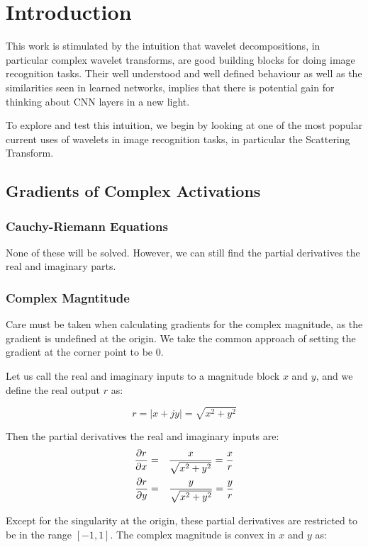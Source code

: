 \chapter{Introduction}\label{ch:intro}

This work is stimulated by the intuition that wavelet decompositions, in particular
complex wavelet transforms, are good building blocks for doing image recognition
tasks. Their well understood and well defined behaviour as well as the
similarities seen in learned networks, implies that there is potential gain for
thinking about CNN layers in a new light. 

To explore and test this intuition, we begin by looking at one of the most popular current uses of
wavelets in image recognition tasks, in particular the Scattering Transform. 

\section{Gradients of Complex Activations}
\subsection{Cauchy-Riemann Equations}
None of these will be solved. However, we can still find the partial derivatives \wrt the real and
imaginary parts.

\subsection{Complex Magntitude}
Care must be taken when calculating gradients for the complex magnitude, as the
gradient is undefined at the origin. We take the common approach of setting the
gradient at the corner point to be 0. 

Let us call the real and imaginary inputs to a magnitude block $x$ and $y$,
and we define the real output $r$ as:

$$ r = |x + jy| = \sqrt{x^2 + y^2} $$

Then the partial derivatives \wrt the real and imaginary inputs are:
\begin{eqnarray*}
  \frac{\partial r}{\partial x} & = & \frac{x}{\sqrt{x^2 + y^2}} = \frac{x}{r} \\
  \frac{\partial r}{\partial y} & = & \frac{y}{\sqrt{x^2 + y^2}} = \frac{y}{r} \\
\end{eqnarray*}

Except for the singularity at the origin, these partial derivatives are restricted to be in the
range $[-1, 1]$. The complex magnitude is convex in $x$ and $y$ as:

